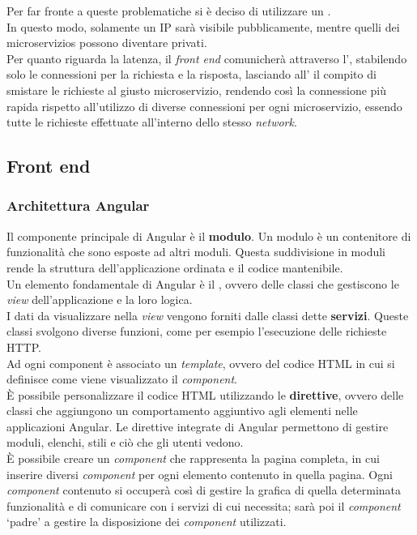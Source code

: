 \noindent Per far fronte a queste problematiche si è deciso di utilizzare un
.\\
In questo modo, solamente un \gls{IP} sarà visibile pubblicamente, mentre
quelli dei \glspl{microservizio} possono diventare privati.\\
Per quanto riguarda la latenza, il \textit{front end} comunicherà attraverso
l', stabilendo solo le connessioni per la richiesta e
la risposta, lasciando all' il compito di smistare le
richieste al giusto \gls{microservizio}, rendendo così la connessione più
rapida rispetto all'utilizzo di diverse connessioni per ogni
\gls{microservizio}, essendo tutte le richieste effettuate all'interno dello
stesso \textit{network}.

\subsection{Front end}
\subsubsection{Architettura Angular}
Il componente principale di Angular è il \textbf{modulo}. Un modulo è un
contenitore di funzionalità che sono esposte ad altri moduli. Questa
suddivisione in moduli rende la struttura dell'applicazione ordinata e il
codice mantenibile.\\
Un elemento fondamentale di Angular è il , ovvero delle classi
che gestiscono le \textit{view} dell'applicazione e la loro logica.\\
I dati da visualizzare nella \textit{view} vengono forniti dalle classi dette
\textbf{servizi}. Queste classi svolgono diverse funzioni, come per esempio
l'esecuzione delle richieste HTTP.\\
Ad ogni component è associato un \textit{template}, ovvero del codice HTML in
cui si definisce come viene visualizzato il \textit{component}.\\
È possibile personalizzare il codice HTML utilizzando le \textbf{direttive},
ovvero delle classi che aggiungono un comportamento aggiuntivo agli elementi
nelle applicazioni Angular. Le direttive integrate di Angular permettono di
gestire moduli, elenchi, stili e ciò che gli utenti vedono.\\
È possibile creare un \textit{component} che rappresenta la pagina completa, in
cui inserire diversi \textit{component} per ogni elemento contenuto in quella
pagina.
Ogni \textit{component} contenuto si occuperà così di gestire la grafica di
quella determinata funzionalità e di comunicare con i servizi di cui necessita;
sarà poi il \textit{component} \enquote*{padre} a gestire la disposizione dei
\textit{component} utilizzati. \cite{site-angular-concepts}

